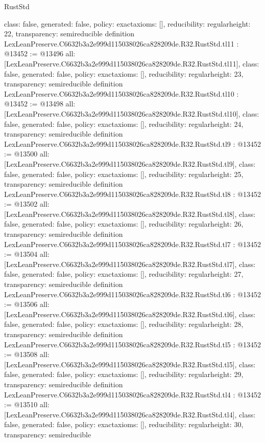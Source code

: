 \begin{lexlean}{RustStd}
\begin{coremodule}
{  class: false,
  generated: false,
  policy: exact{axioms: []},
  reducibility: regular{height: 22},
  transparency: semireducible
}
definition LexLeanPreserve.C6632b3a2e999d115038026ca828209de.R32.RustStd.tl11 : @13452 := @13496 {
  all: [LexLeanPreserve.C6632b3a2e999d115038026ca828209de.R32.RustStd.tl11],
  class: false,
  generated: false,
  policy: exact{axioms: []},
  reducibility: regular{height: 23},
  transparency: semireducible
}
definition LexLeanPreserve.C6632b3a2e999d115038026ca828209de.R32.RustStd.tl10 : @13452 := @13498 {
  all: [LexLeanPreserve.C6632b3a2e999d115038026ca828209de.R32.RustStd.tl10],
  class: false,
  generated: false,
  policy: exact{axioms: []},
  reducibility: regular{height: 24},
  transparency: semireducible
}
definition LexLeanPreserve.C6632b3a2e999d115038026ca828209de.R32.RustStd.tl9 : @13452 := @13500 {
  all: [LexLeanPreserve.C6632b3a2e999d115038026ca828209de.R32.RustStd.tl9],
  class: false,
  generated: false,
  policy: exact{axioms: []},
  reducibility: regular{height: 25},
  transparency: semireducible
}
definition LexLeanPreserve.C6632b3a2e999d115038026ca828209de.R32.RustStd.tl8 : @13452 := @13502 {
  all: [LexLeanPreserve.C6632b3a2e999d115038026ca828209de.R32.RustStd.tl8],
  class: false,
  generated: false,
  policy: exact{axioms: []},
  reducibility: regular{height: 26},
  transparency: semireducible
}
definition LexLeanPreserve.C6632b3a2e999d115038026ca828209de.R32.RustStd.tl7 : @13452 := @13504 {
  all: [LexLeanPreserve.C6632b3a2e999d115038026ca828209de.R32.RustStd.tl7],
  class: false,
  generated: false,
  policy: exact{axioms: []},
  reducibility: regular{height: 27},
  transparency: semireducible
}
definition LexLeanPreserve.C6632b3a2e999d115038026ca828209de.R32.RustStd.tl6 : @13452 := @13506 {
  all: [LexLeanPreserve.C6632b3a2e999d115038026ca828209de.R32.RustStd.tl6],
  class: false,
  generated: false,
  policy: exact{axioms: []},
  reducibility: regular{height: 28},
  transparency: semireducible
}
definition LexLeanPreserve.C6632b3a2e999d115038026ca828209de.R32.RustStd.tl5 : @13452 := @13508 {
  all: [LexLeanPreserve.C6632b3a2e999d115038026ca828209de.R32.RustStd.tl5],
  class: false,
  generated: false,
  policy: exact{axioms: []},
  reducibility: regular{height: 29},
  transparency: semireducible
}
definition LexLeanPreserve.C6632b3a2e999d115038026ca828209de.R32.RustStd.tl4 : @13452 := @13510 {
  all: [LexLeanPreserve.C6632b3a2e999d115038026ca828209de.R32.RustStd.tl4],
  class: false,
  generated: false,
  policy: exact{axioms: []},
  reducibility: regular{height: 30},
  transparency: semireducible
}
\end{coremodule}
\end{lexlean}
